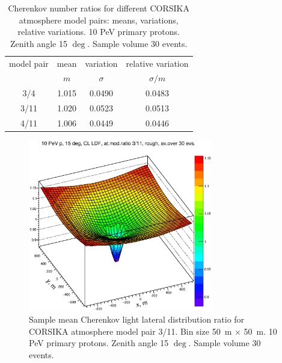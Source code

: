 \documentclass[final,5p,times,twocolumn]{elsarticle}
\begin{document}
\begin{table}[t]
\centering
\caption{Cherenkov number ratios for different CORSIKA atmosphere model pairs: means, variations, relative variations. 10 PeV primary protons. Zenith angle 15 $\deg$. Sample volume 30 events.}
\label{tab:atmmod}
\vspace{1pc}
\begin{tabular}{|c||c|c|c|}
\hline
model pair  & mean &  variation   & relative variation \\ 
            &  $m$ & $\sigma$     & $\sigma/m$          \\ 
\hline 
\hline 
 3/4 &  1.015    &  0.0490     &   0.0483   \\
\hline
3/11 &  1.020    &  0.0523     &   0.0513    \\
\hline
4/11 &  1.006    &  0.0449     &   0.0446    \\
\hline
\end{tabular}
\end{table}



\begin{figure}[tb]
\centering
\includegraphics[width=19pc]{figs/3d11.eps}%
\vspace{-1.0pc}
\caption{Sample mean Cherenkov light lateral distribution ratio for CORSIKA atmosphere model
pair 3/11. Bin size 50~m $\times$ 50~m. 10 PeV primary protons. Zenith angle 15 $\deg$. Sample volume 30 events.}
\label{fig:3d4}
\end{figure}
\end{document}
